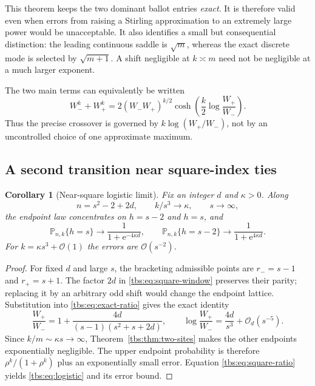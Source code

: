\documentclass[11pt,a4paper]{article}
\numberwithin{equation}{section}
\newtheorem{corollary}[theorem]{Corollary}
\theoremstyle{definition}
\newcommand{\ee}{\mathrm e}
\newcommand{\OO}{\mathcal O}
\begin{document}
This theorem keeps the two dominant ballot entries \emph{exact}. It is
therefore valid even when errors from raising a Stirling approximation
to an extremely large power would be unacceptable. It also identifies a
small but consequential distinction: the leading continuous saddle is
$\sqrt m$, whereas the exact discrete mode is selected by
$\sqrt{m+1}$. A shift negligible at $k\asymp m$ need not be negligible
at a much larger exponent.

The two main terms can equivalently be written
\begin{equation}\label{tbs:eq:cosh-exact}
 W_-^k+W_+^k
 =2(W_-W_+)^{k/2}\cosh\!\left(\frac{k}{2}
                         \log\frac{W_+}{W_-}\right).
\end{equation}
Thus the precise crossover is governed by $k\log(W_+/W_-)$, not by an
uncontrolled choice of one approximate maximum.

\subsection{A second transition near square-index ties}
\begin{corollary}[Near-square logistic limit]\label{tbs:cor:logistic}
Fix an integer $d$ and $\kappa>0$. Along
\begin{equation}\label{tbs:eq:square-window}
 n=s^2-2+2d,\qquad k/s^3\longrightarrow\kappa,
 \qquad s\to\infty,
\end{equation}
the endpoint law concentrates on $h=s-2$ and $h=s$, and
\begin{equation}\label{tbs:eq:logistic}
 \mathbb P_{n,k}\{h=s\}\longrightarrow
 \frac{1}{1+\ee^{-4\kappa d}},\qquad
 \mathbb P_{n,k}\{h=s-2\}\longrightarrow
 \frac{1}{1+\ee^{4\kappa d}}.
\end{equation}
For $k=\kappa s^3+\OO(1)$ the errors are $\OO(s^{-2})$.
\end{corollary}
\begin{proof}
For fixed $d$ and large $s$, the bracketing admissible points are
$r_-=s-1$ and $r_+=s+1$. The factor $2d$ in
\eqref{tbs:eq:square-window} preserves their parity; replacing it by an
arbitrary odd shift would change the endpoint lattice. Substitution into
\eqref{tbs:eq:exact-ratio} gives the exact identity
\begin{equation}\label{tbs:eq:square-ratio}
 \frac{W_+}{W_-}
 =1+\frac{4d}{(s-1)(s^2+s+2d)},
 \qquad
 \log\frac{W_+}{W_-}=\frac{4d}{s^3}+\OO_d(s^{-5}).
\end{equation}
Since $k/m\sim\kappa s\to\infty$,
Theorem~\ref{tbs:thm:two-sites} makes the other endpoints exponentially
negligible. The upper endpoint probability is therefore
$\rho^k/(1+\rho^k)$ plus an exponentially small error. Equation
\eqref{tbs:eq:square-ratio} yields \eqref{tbs:eq:logistic} and its error bound.
\end{proof}
\end{document}
